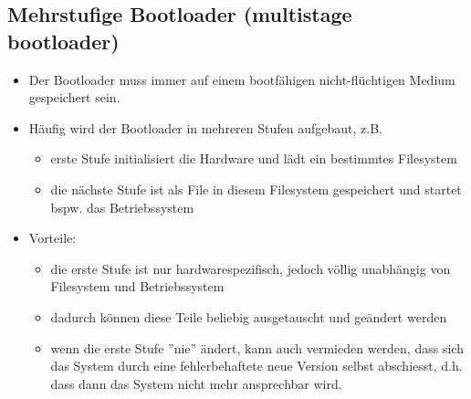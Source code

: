 \subsection{Mehrstufige Bootloader (multistage bootloader)}
\begin{itemize}
  \item Der Bootloader muss immer auf einem bootfähigen nicht-flüchtigen Medium gespeichert sein.
  \item Häufig wird der Bootloader in mehreren Stufen aufgebaut, z.B.
  \begin{itemize}
    \item erste Stufe initialisiert die Hardware und lädt ein bestimmtes Filesystem
    \item die nächste Stufe ist als File in diesem Filesystem gespeichert und startet bspw. das Betriebssystem
  \end{itemize}
  \item Vorteile:
  \begin{itemize}
    \item die erste Stufe ist nur hardwarespezifisch, jedoch völlig unabhängig von Filesystem und Betriebssystem
    \item dadurch können diese Teile beliebig ausgetauscht und geändert werden
    \item wenn die erste Stufe ''nie'' ändert, kann auch vermieden werden, dass sich das System durch eine fehlerbehaftete neue Version selbst abschiesst, d.h. dass dann das System nicht mehr ansprechbar wird.
  \end{itemize}
\end{itemize}

